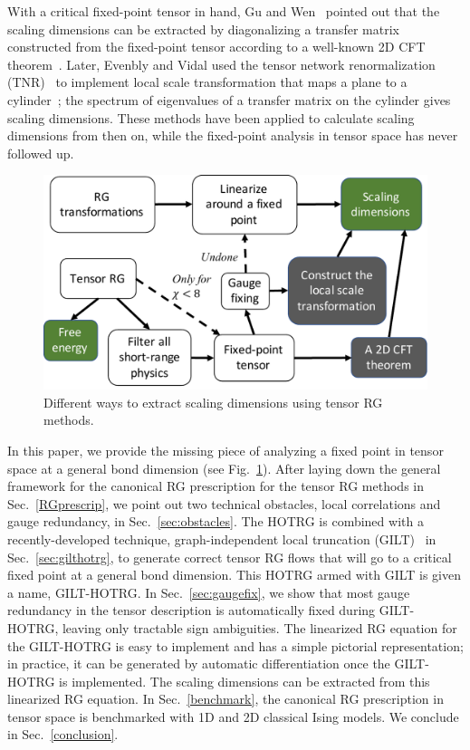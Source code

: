 \documentclass[aps,prr,reprint,superscriptaddress,floatfix]{revtex4-2}
\begin{document}
With a critical fixed-point tensor in hand, Gu and Wen~\cite{GuWen2009} pointed out that the scaling dimensions can be extracted by diagonalizing a transfer matrix constructed from the fixed-point tensor according to a well-known 2D CFT theorem~\cite{cardy1986}. 
Later, Evenbly and Vidal used the tensor network renormalization (TNR)~\cite{tnr,tnralgo} to implement local scale transformation that maps a plane to a cylinder~\cite{EvenblyDilatationOp}; the spectrum of eigenvalues of a transfer matrix on the cylinder gives scaling dimensions.
These methods have been applied to calculate scaling dimensions from then on, while the fixed-point analysis in tensor space has never followed up.
%
\begin{figure}[tb]
    \includegraphics[width=\columnwidth]{./figures/researchBG.pdf}
    \caption{\label{fig:researchBG}
        Different ways to extract scaling dimensions using tensor RG methods.
    }
\end{figure}


In this paper, we provide the missing piece of analyzing a fixed point in tensor space at a general bond dimension (see Fig.~\ref{fig:researchBG}).
After laying down the general framework for the canonical RG prescription for the tensor RG methods in Sec.~\ref{RGprescrip}, we point out two technical obstacles, local correlations and gauge redundancy, in Sec.~\ref{sec:obstacles}.
The HOTRG is combined with a recently-developed technique, graph-independent local truncation (GILT)~\cite{gilts} in Sec.~\ref{sec:gilthotrg}, to generate correct tensor RG flows that will go to a critical fixed point at a general bond dimension. 
This HOTRG armed with GILT is given a name, GILT-HOTRG\@. 
In Sec.~\ref{sec:gaugefix}, we show that most gauge redundancy in the tensor description is automatically fixed during GILT-HOTRG, leaving only tractable sign ambiguities.
The linearized RG equation for the GILT-HOTRG is easy to implement and has a simple pictorial representation; in practice, it can be generated by automatic differentiation once the GILT-HOTRG is implemented.
The scaling dimensions can be extracted from this linearized RG equation.
In Sec.~\ref{benchmark}, the canonical RG prescription in tensor space is benchmarked with 1D and 2D classical Ising models.
We conclude in Sec.~\ref{conclusion}.
\end{document}
